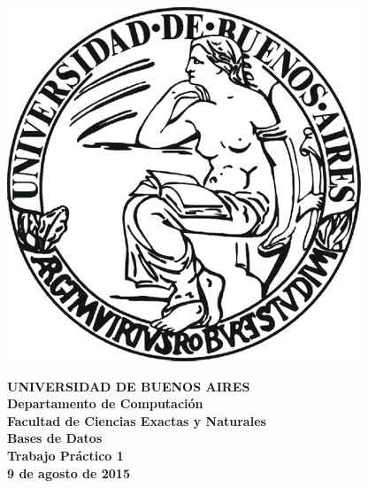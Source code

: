 \documentclass[11pt,a4paper]{article}
\begin{document}

\def\Materia{Bases de Datos}
\def\Titulo{Trabajo Pr\'{a}ctico 1}
\def\Fecha{9 de agosto de 2015}


\thispagestyle{empty}

\begin{center}
	\includegraphics[scale = 0.25]{imagenes/logo_uba.jpg}
\end{center}

\begin{center}
	{\textbf{\large UNIVERSIDAD DE BUENOS AIRES}}\\[1.5em]
	{\textbf{\large Departamento de Computaci\'{o}n}}\\[1.5em]
    {\textbf{\large Facultad de Ciencias Exactas y Naturales}}\\
    \vspace{35mm}
    {\LARGE\textbf{\Materia}}\\[1em]    
    \vspace{15mm}
    {\Large \textbf{\Titulo}}\\[1em]
    \vspace{15mm}
    {\textbf{\Large \Fecha}}\\
    \vspace{15mm}
    \textbf{\tablaints}
\end{center}

\newpage
\thispagestyle{empty}
\tableofcontents

\parskip=5pt
\setlength{\parindent}{0pt}

\newpage
\setcounter{page}{1}
\pagestyle{plain}








\end{document}
